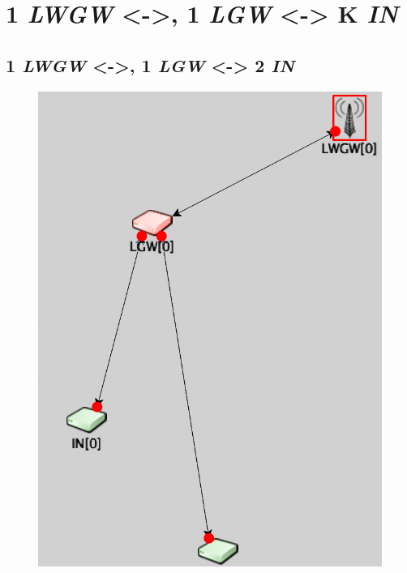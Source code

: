 \documentclass[a4paper]{article}
\begin{document}
\section{ 1 \textit{LWGW} <->, 1 \textit{LGW} <-> K \textit{IN} }
\subsection{ 1 \textit{LWGW} <->, 1 \textit{LGW} <-> 2 \textit{IN} }
\begin{figure}[h!]
\centering
\includegraphics[scale=0.5]{cas_2.png} 
\end{figure}
\newpage
\end{document}
